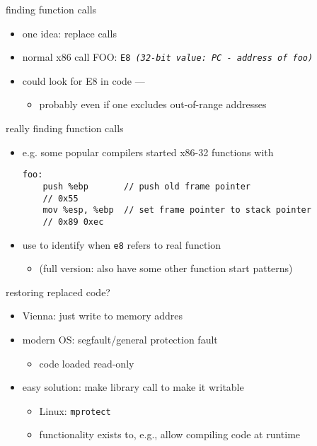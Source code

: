 \begin{frame}[fragile,label=findValidFindFunc]{finding function calls}
    \begin{itemize}
    \item one idea: replace calls
    \item normal x86 call FOO: {\tt E8 \textit{(32-bit value: PC - address of foo)}}
    \item could look for E8 in code --- 
        \begin{itemize}
        \item probably even if one excludes out-of-range addresses
        \end{itemize}
    \end{itemize}
\end{frame}

\begin{frame}[fragile,label=findValidFindFunc2]{really finding function calls}
\lstset{language=myasm,style=small}
    \begin{itemize}
    \item e.g. some popular compilers started x86-32 functions with
\begin{lstlisting}
foo:
    push %ebp       // push old frame pointer
    // 0x55
    mov %esp, %ebp  // set frame pointer to stack pointer
    // 0x89 0xec
\end{lstlisting}
    \item use to identify when {\tt e8} refers to real function
    \begin{itemize}
    \item (full version: also have some other function start patterns)
    \end{itemize}
    \end{itemize}
\end{frame}


\begin{frame}{restoring replaced code?}
    \begin{itemize}
    \item Vienna: just write to memory addres
    \vspace{.5cm}
    \item modern OS: segfault/general protection fault
        \begin{itemize}
        \item code loaded read-only
        \end{itemize}
    \item easy solution: make library call to make it writable
        \begin{itemize}
        \item Linux: \texttt{mprotect}
        \item functionality exists to, e.g., allow compiling code at runtime
        \end{itemize}
    \end{itemize}
\end{frame}

